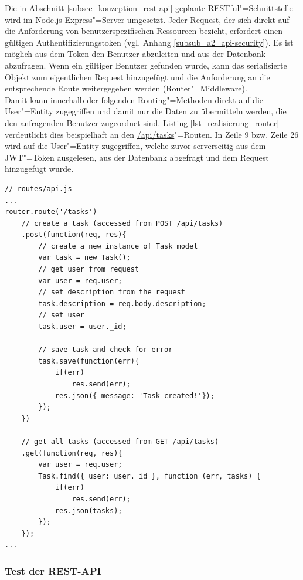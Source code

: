 Die in Abschnitt \ref{subsec_konzeption_rest-api} geplante RESTful"=Schnittstelle wird im Node.js Express"=Server umgesetzt. Jeder Request, der sich direkt auf die Anforderung von benutzerspezifischen Ressourcen bezieht, erfordert einen gültigen Authentifizierungstoken (vgl. Anhang \ref{subsub_a2_api-security}). Es ist möglich aus dem Token den Benutzer abzuleiten und aus der Datenbank abzufragen. Wenn ein gültiger Benutzer gefunden wurde, kann das serialisierte Objekt zum eigentlichen Request hinzugefügt und die Anforderung an die entsprechende Route weitergegeben werden (\glqq Router"=Middleware\grqq).\\
Damit kann innerhalb der folgenden Routing"=Methoden direkt auf die User"=Entity zugegriffen und damit nur die Daten zu übermitteln werden, die den anfragenden Benutzer zugeordnet sind. Listing \ref{lst_realisierung_router} verdeutlicht dies beispielhaft an den \url{/api/tasks}"=Routen. In Zeile 9 bzw. Zeile 26 wird auf die User"=Entity zugegriffen, welche zuvor serverseitig aus dem JWT"=Token ausgelesen, aus der Datenbank abgefragt und dem Request hinzugefügt wurde. \\

\begin{lstlisting}[caption={Verbindung zur Datenbank konfigurieren},label={lst_realisierung_router}, frame=single]
// routes/api.js 
...
router.route('/tasks')
    // create a task (accessed from POST /api/tasks)
    .post(function(req, res){
        // create a new instance of Task model
        var task = new Task();                      
        // get user from request
        var user = req.user;                        
        // set description from the request
        task.description = req.body.description; 
        // set user   
        task.user = user._id;
        
        // save task and check for error
        task.save(function(err){
            if(err)
                res.send(err);
            res.json({ message: 'Task created!'});
        });
    })

    // get all tasks (accessed from GET /api/tasks)
    .get(function(req, res){
        var user = req.user;                  
        Task.find({ user: user._id }, function (err, tasks) {
            if(err)
                res.send(err);
            res.json(tasks);
        });
    });
...
\end{lstlisting}

\newpage
\subsubsection{Test der REST-API}

